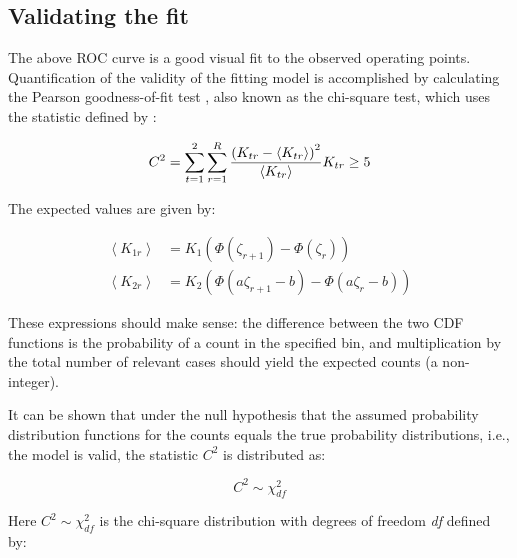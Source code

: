 \documentclass[
]{book}
\begin{document}
\hypertarget{binormal-model-curve-fitting-validation}{%
\subsection{Validating the fit}\label{binormal-model-curve-fitting-validation}}

The above ROC curve is a good visual fit to the observed operating points. Quantification of the validity of the fitting model is accomplished by calculating the Pearson goodness-of-fit test \citep{RN2656}, also known as the chi-square test, which uses the statistic defined by \citep{larsen2005introduction}:

\begin{equation} 
C^2=\sum_{t=1}^{2}\sum_{r=1}^{R}\frac{\left (K_{tr}-\left \langle K_{tr} \right \rangle  \right )^2}{\left \langle K_{tr} \right \rangle}\\
K_{tr} \geq 5
\label{eq:binormal-modelGoodnessFit}
\end{equation}

The expected values are given by:

\begin{equation}
\begin{split}
\left \langle K_{1r} \right \rangle &=K_1\left ( \Phi\left ( \zeta_{r+1} \right ) - \Phi\left ( \zeta_r \right )  \right ) \\
\left \langle K_{2r} \right \rangle &=K_2\left ( \Phi\left ( a\zeta_{r+1}-b \right ) - \Phi\left ( a\zeta_r - b\right )  \right )
\end{split}
\label{eq:binormal-modelGoodnessFitExpVals}
\end{equation}

These expressions should make sense: the difference between the two CDF functions is the probability of a count in the specified bin, and multiplication by the total number of relevant cases should yield the expected counts (a non-integer).

It can be shown that under the null hypothesis that the assumed probability distribution functions for the counts equals the true probability distributions, i.e., the model is valid, the statistic \(C^2\) is distributed as:

\begin{equation} 
C^2\sim \chi_{df}^{2}
\label{eq:binormal-modelGoodnessFitDistr}
\end{equation}

Here \(C^2\sim \chi_{df}^{2}\) is the chi-square distribution with degrees of freedom \emph{df} defined by:
\end{document}
